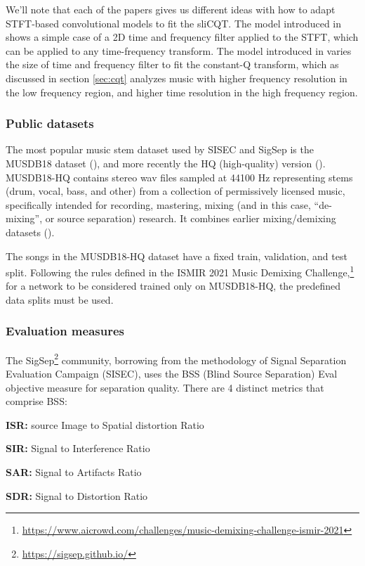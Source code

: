 \documentclass[report.tex]{subfiles}
\begin{document}
We'll note that each of the papers gives us different ideas with how to adapt STFT-based convolutional models to fit the sliCQT. The model introduced in \textcite{plumbley1} shows a simple case of a 2D time and frequency filter applied to the STFT, which can be applied to any time-frequency transform. The model introduced in \textcite{plumbley2} varies the size of time and frequency filter to fit the constant-Q transform, which as discussed in section \ref{sec:cqt} analyzes music with higher frequency resolution in the low frequency region, and higher time resolution in the high frequency region.

\subsubsection{Public datasets}

The most popular music stem dataset used by SISEC and SigSep is the MUSDB18 dataset (\cite{musdb18}), and more recently the HQ (high-quality) version (\cite{musdb18hq}). MUSDB18-HQ contains stereo wav files sampled at 44100 Hz representing stems (drum, vocal, bass, and other) from a collection of permissively licensed music, specifically intended for recording, mastering, mixing (and in this case, ``de-mixing'', or source separation) research. It combines earlier mixing/demixing datasets (\cite{otherdataset1, otherdataset2}).

The songs in the MUSDB18-HQ dataset have a fixed train, validation, and test split. Following the rules defined in the ISMIR 2021 Music Demixing Challenge,\footnote{\url{https://www.aicrowd.com/challenges/music-demixing-challenge-ismir-2021}} for a network to be considered trained only on MUSDB18-HQ, the predefined data splits must be used.

\subsubsection{Evaluation measures}

The SigSep\footnote{\url{https://sigsep.github.io/}} community, borrowing from the methodology of Signal Separation Evaluation Campaign (SISEC), uses the BSS (Blind Source Separation) Eval \cite{bss} objective measure for separation quality. There are 4 distinct metrics that comprise BSS:

\begin{tight_itemize}
\item
	\textbf{ISR:} source Image to Spatial distortion Ratio
\item
	\textbf{SIR:} Signal to Interference Ratio
\item
	\textbf{SAR:} Signal to Artifacts Ratio
\item
	\textbf{SDR:} Signal to Distortion Ratio
\end{tight_itemize}
\end{document}
